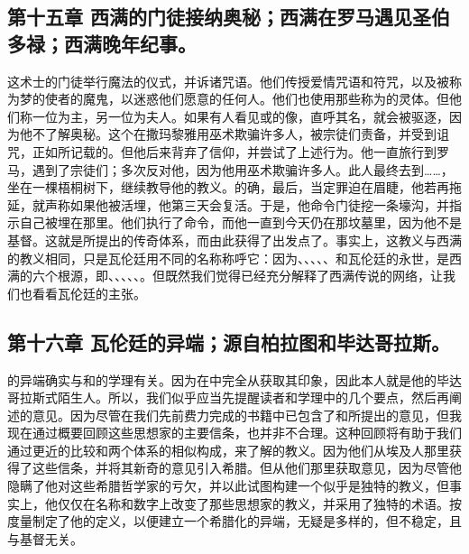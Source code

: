 \subsection{第十五章 西满的门徒接纳奥秘；西满在罗马遇见圣伯多禄；西满晚年纪事。}

这术士的门徒举行魔法的仪式，并诉诸咒语。他们传授爱情咒语和符咒，以及被称为梦的使者的魔鬼，以迷惑他们愿意的任何人。他们也使用那些称为的灵体。但他们称一位为主，另一位为夫人。如果有人看见或的像，直呼其名，就会被驱逐，因为他不了解奥秘。这个在撒玛黎雅用巫术欺骗许多人，被宗徒们责备，并受到诅咒，正如所记载的。但他后来背弃了信仰，并尝试了上述行为。他一直旅行到罗马，遇到了宗徒们；多次反对他，因为他用巫术欺骗许多人。此人最终去到……，坐在一棵梧桐树下，继续教导他的教义。的确，最后，当定罪迫在眉睫，他若再拖延，就声称如果他被活埋，他第三天会复活。于是，他命令门徒挖一条壕沟，并指示自己被埋在那里。他们执行了命令，而他一直到今天仍在那坟墓里，因为他不是基督。这就是所提出的传奇体系，而由此获得了出发点了。事实上，这教义与西满的教义相同，只是瓦伦廷用不同的名称称呼它：因为、、、、、和瓦伦廷的永世，是西满的六个根源，即、、、、、。但既然我们觉得已经充分解释了西满传说的网络，让我们也看看瓦伦廷的主张。\par


\subsection{第十六章 瓦伦廷的异端；源自柏拉图和毕达哥拉斯。}

的异端确实与和的学理有关。因为在中完全从获取其印象，因此本人就是他的毕达哥拉斯式陌生人。所以，我们似乎应当先提醒读者和学理中的几个要点，然后再阐述的意见。因为尽管在我们先前费力完成的书籍中已包含了和所提出的意见，但我现在通过概要回顾这些思想家的主要信条，也并非不合理。这种回顾将有助于我们通过更近的比较和两个体系的相似构成，来了解的教义。因为他们从埃及人那里获得了这些信条，并将其新奇的意见引入希腊。但从他们那里获取意见，因为尽管他隐瞒了他对这些希腊哲学家的亏欠，并以此试图构建一个似乎是独特的教义，但事实上，他仅仅在名称和数字上改变了那些思想家的教义，并采用了独特的术语。按度量制定了他的定义，以便建立一个希腊化的异端，无疑是多样的，但不稳定，且与基督无关。\par

